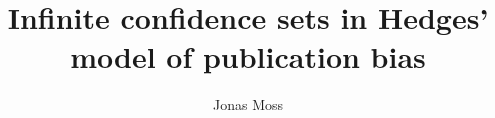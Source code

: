 \documentclass{standalone}
\begin{document}
\author
{
    Jonas Moss
}
\title{Infinite confidence sets in Hedges' model of publication
bias}
\maketitle

\end{document}
